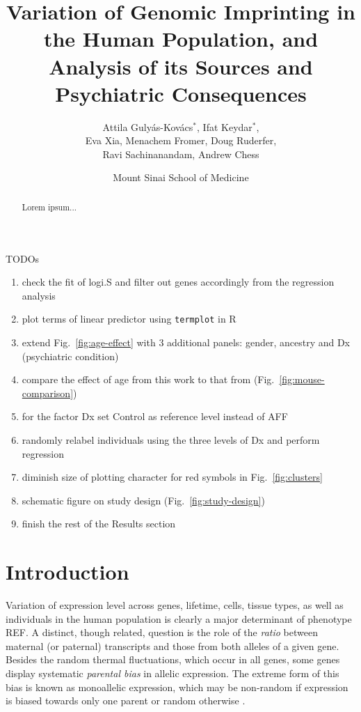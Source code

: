 \documentclass[letterpaper]{article}
\title{Variation of Genomic Imprinting in the Human Population,
and Analysis of its Sources and Psychiatric Consequences}
\author{Attila Guly\'{a}s-Kov\'{a}cs\(^\ast\), Ifat Keydar\(^\ast\),\\
Eva Xia, Menachem Fromer, Doug Ruderfer,\\
Ravi Sachinanandam, Andrew Chess}
\date{Mount Sinai School of Medicine}
\begin{document}
\maketitle

TODOs
\begin{enumerate}
\item check the fit of logi.S and filter out genes accordingly from the
regression analysis
\item plot terms of linear predictor using \texttt{termplot} in R
\item extend Fig.~\ref{fig:age-effect} with 3 additional panels: gender,
ancestry and Dx (psychiatric condition)
\item compare the effect of age from this work to that from
\cite{Perez2015} (Fig.~\ref{fig:mouse-comparison})
\item for the factor Dx set Control as reference level instead of AFF
\item randomly relabel individuals using the three levels of Dx and perform
regression
\item diminish size of plotting character for red symbols in
Fig.~\ref{fig:clusters} 
\item schematic figure on study design (Fig.~\ref{fig:study-design}) 
\item finish the rest of the Results section
\end{enumerate}

\newpage

\maketitle

\begin{abstract}
Lorem ipsum...
\end{abstract}

\section{Introduction}

Variation of expression level across genes, lifetime, cells, tissue types, as
well as individuals in the human population is clearly a major determinant of
phenotype REF.  A distinct, though related, question is the role of the
\emph{ratio} between maternal (or paternal) transcripts and those from both
alleles of a given gene.  Besides the random thermal fluctuations, which occur
in all genes, some genes display systematic \emph{parental bias} in allelic
expression.  The extreme form of this bias is known as monoallelic expression,
which may be non-random if expression is biased towards only one parent or
random otherwise \cite{Chess2012}.
\end{document}
